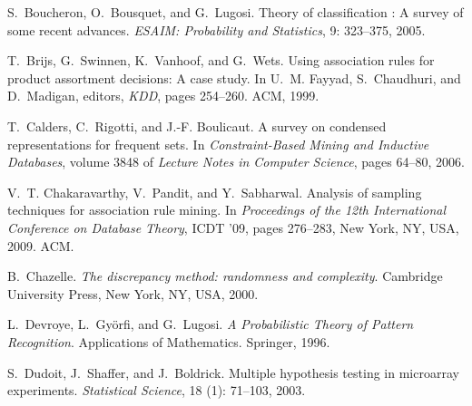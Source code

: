 \begin{thebibliography}{42}
S.~Boucheron, O.~Bousquet, and G.~Lugosi.
\newblock Theory of classification : A survey of some recent advances.
\newblock \emph{{ESAIM}: Probability and Statistics}, 9: 323--375,
  2005.

T.~Brijs, G.~Swinnen, K.~Vanhoof, and G.~Wets.
\newblock Using association rules for product assortment decisions: A case
  study.
\newblock In U.~M. Fayyad, S.~Chaudhuri, and D.~Madigan, editors, \emph{KDD},
  pages 254--260. ACM, 1999.

T.~Calders, C.~Rigotti, and J.-F. Boulicaut.
\newblock A survey on condensed representations for frequent sets.
\newblock In \emph{Constraint-Based Mining and Inductive Databases}, volume
  3848 of \emph{Lecture Notes in Computer Science}, pages 64--80, 2006.

V.~T. Chakaravarthy, V.~Pandit, and Y.~Sabharwal.
\newblock Analysis of sampling techniques for association rule mining.
\newblock In \emph{Proceedings of the 12th International Conference on Database
  Theory}, ICDT '09, pages 276--283, New York, NY, USA, 2009. ACM.

B.~Chazelle.
\newblock \emph{The discrepancy method: randomness and complexity}.
\newblock Cambridge University Press, New York, NY, USA, 2000.

L.~Devroye, L.~Gy{\"o}rfi, and G.~Lugosi.
\newblock \emph{A Probabilistic Theory of Pattern Recognition}.
\newblock Applications of Mathematics. Springer, 1996.

S.~Dudoit, J.~Shaffer, and J.~Boldrick.
\newblock Multiple hypothesis testing in microarray experiments.
\newblock \emph{Statistical Science}, 18 (1): 71--103, 2003.


\end{thebibliography}
